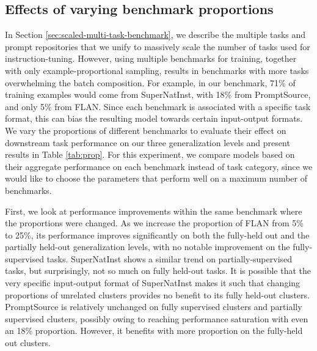 \subsection{Effects of varying benchmark proportions}
\label{subsec:prop}

In Section \ref{sec:scaled-multi-task-benchmark}, we describe the multiple tasks and prompt repositories \citep{sanh2021t0,wang2022niv2,wei2021flan,ye2021crossfit,aribandi2021ext5} that we unify to massively scale the number of tasks used for instruction-tuning. However, using multiple benchmarks for training, together with only example-proportional sampling, results in benchmarks with more tasks overwhelming the batch composition. For example, in our benchmark, 71\% of training examples would come from SuperNatInst, with 18\% from PromptSource, and only 5\% from FLAN. Since each benchmark is associated with a specific task format, this can bias the resulting model towards certain input-output formats. We vary the proportions of different benchmarks to evaluate their effect on downstream task performance on our three generalization levels and present results in Table \ref{tab:prop}. For this experiment, we compare models based on their aggregate performance on each benchmark instead of task category, since we would like to choose the parameters that perform well on a maximum number of benchmarks.

First, we look at performance improvements within the same benchmark where the proportions were changed. As we increase the proportion of FLAN from 5\% to 25\%, its performance improves significantly on both the fully-held out and the partially held-out generalization levels, with no notable improvement on the fully-supervised tasks. SuperNatInst shows a similar trend on partially-supervised tasks, but surprisingly, not so much on fully held-out tasks. It is possible that the very specific input-output format of SuperNatInst makes it such that changing proportions of unrelated clusters provides no benefit to its fully held-out clusters. PromptSource is relatively unchanged on fully supervised clusters and partially supervised clusters, possibly owing to reaching performance saturation with even an 18\% proportion. However, it benefits with more proportion on the fully-held out clusters. 

